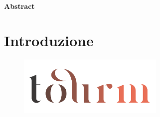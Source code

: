 \documentclass[12pt]{article}
\begin{document}
\newpage

\newpage

\thispagestyle{plain}
\begin{center}
    \vfill
    \Huge
    \textbf{Abstract}
    \vspace{2cm}

\end{center}

\vfill


\newpage
\tableofcontents
\newpage

\section{Introduzione}
\begin{center}
    \begin{figure}[htp]
        \centering
        \includegraphics[width=7cm]{images/tourm_logo_transparent.png}
        \vspace{-2.7\baselineskip}
    \end{figure}
\end{center}
\end{document}
